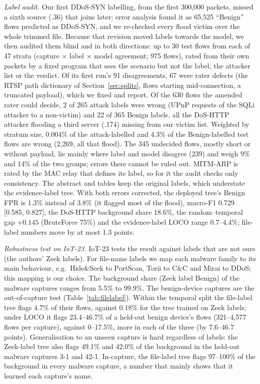 \emph{Label audit.} Our first DDoS-SYN labelling, from the first 300,000 packets, missed a sixth source (.36) that joins later; error analysis found it as 65,525 ``Benign'' flows predicted as DDoS-SYN, and we re-checked every flood victim over the whole trimmed file. Because that revision moved labels towards the model, we then audited them blind and in both directions: up to 30 test flows from each of 47 strata (capture $\times$ label $\times$ model agreement; 975 flows), rated from their own packets by a fixed program that sees the scenario but not the label, the attacker list or the verdict. Of its first run's 91 disagreements, 67 were rater defects (the RTSP path dictionary of Section~\ref{sec:splits}, flows starting mid-connection, a truncated payload), which we fixed and report. Of the 630 flows the amended rater could decide, 2 of 265 attack labels were wrong (UPnP requests of the SQLi attacker to a non-victim) and 22 of 365 Benign labels, all the DoS-HTTP attacker flooding a third server (.174) missing from our victim list. Weighted by stratum size, 0.004\% of the attack-labelled and 4.3\% of the Benign-labelled test flows are wrong (2,269, all that flood). The 345 undecided flows, mostly short or without payload, lie mainly where label and model disagree (239) and weigh 9\% and 14\% of the two groups; errors there cannot be ruled out. MITM-ARP is rated by the MAC relay that defines its label, so for it the audit checks only consistency. The abstract and tables keep the original labels, which understate the evidence-label tree. With both errors corrected, the deployed tree's Benign FPR is 1.3\% instead of 3.8\% (it flagged most of the flood), macro-F1 0.729 [0.585, 0.827], the DoS-HTTP background share 18.6\%, the random--temporal gap $+0.145$ (BruteForce 75\%) and the evidence-label LOCO range 0.7--4.4\%; file-label numbers move by at most 1.3 points.

\emph{Robustness test on IoT-23.} IoT-23 tests the result against labels that are not ours (the authors' Zeek labels). For file-name labels we map each malware family to its main behaviour, e.g.\ Hide\&Seek to PortScan, Torii to C\&C and Mirai to DDoS; this mapping is our choice. The background share (Zeek label Benign) of the malware captures ranges from 5.5\% to 99.9\%. The benign-device captures are the out-of-capture test (Table~\ref{tab:filelabel}). Within the temporal split the file-label tree flags 4.7\% of their flows, against 0.18\% for the tree trained on Zeek labels; under LOCO it flags 23.4--46.7\% of a held-out benign device's flows (321--4,577 flows per capture), against 0--17.5\%, more in each of the three (by 7.6--46.7 points). Generalisation to an unseen capture is hard regardless of labels: the Zeek-label tree also flags 49.1\% and 42.0\% of the background in the held-out malware captures 3-1 and 42-1. In-capture, the file-label tree flags 97--100\% of the background in every malware capture, a number that mainly shows that it learned each capture's name.

